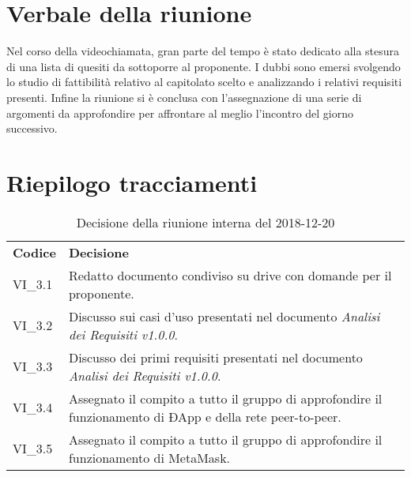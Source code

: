 \section{Verbale della riunione}
Nel corso della videochiamata, gran parte del tempo è stato dedicato alla 
stesura di una lista di quesiti da sottoporre al proponente. I dubbi sono emersi
svolgendo lo studio di fattibilità relativo al capitolato scelto e analizzando i
relativi requisiti presenti.
Infine la riunione si è conclusa con l'assegnazione di una serie di argomenti 
da approfondire per affrontare al meglio l'incontro del giorno 
successivo.

\section{Riepilogo tracciamenti}
\begin{table}[H]
	
	\begin{longtable}{ >{\centering}p{} >{\centering}p{}}
			
		\rowcolorhead
		\centering \textbf{\color{white}Codice} 
		& \centering \textbf{\color{white}Decisione} 
		
		\tabularnewline 
		VI\_3.1 & Redatto documento condiviso su drive con domande per il proponente.
		
		\tabularnewline 
		VI\_3.2 & Discusso sui casi d'uso presentati nel documento \textit{Analisi dei 
					Requisiti v1.0.0}.
		
		\tabularnewline 
		VI\_3.3 & Discusso dei primi requisiti presentati nel documento \textit{Analisi dei 
					Requisiti v1.0.0}.
	
		\tabularnewline 
		VI\_3.4 & Assegnato il compito a tutto il gruppo di approfondire il funzionamento
					di ÐApp\glo{} e della rete peer-to-peer.
		
		\tabularnewline
		VI\_3.5 & Assegnato il compito a tutto il gruppo di approfondire il funzionamento
					di MetaMask\glo{}.
					
	
	\end{longtable}
	\caption{Decisione della riunione interna del 2018-12-20}	

\end{table}

